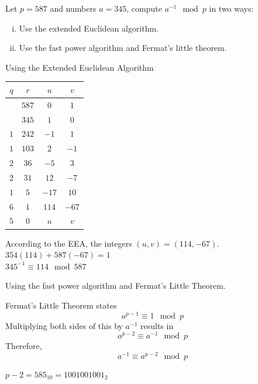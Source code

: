 \documentclass[12pt]{article}
\begin{document}

\problem Let $p=587$ and numbers $a=345$, compute $a^{-1}\mod{p}$ in two
ways:

\begin{enumerate}[(i)]
    \item Use the extended Euclidean algorithm.
    \item Use the fast power algorithm and Fermat’s little theorem. 
\end{enumerate}

\solution Using the Extended Euclidean Algorithm

\noindent
\begin{tabular}{|c|c|c|c|}
    \hline
    $q$ & $r$   & $u$  & $v$  \\
    \hline
        & $587$ & $0$   & $1$   \\
        & $345$ & $1$   & $0$   \\
    $1$ & $242$ & $-1$  & $1$   \\
    $1$ & $103$ & $2$   & $-1$  \\
    $2$ & $36$  & $-5$  & $3$   \\
    $2$ & $31$  & $12$  & $-7$  \\
    $1$ & $5$   & $-17$ & $10$  \\
    $6$ & $1$   & $114$ & $-67$ \\
    $5$ & $0$   & $u$   & $v$   \\
    \hline
\end{tabular}

\noindent
According to the EEA, the integers $(u,v)=(114,-67)$.\\
$354(114)+587(-67)=1$\\
$345^{-1}\equiv114\mod{587}$

\newpage
\noindent
Using the fast power algorithm and Fermat's Little Theorem.

\noindent
Fermat's Little Theorem states
\[a^{p-1}\equiv 1\mod{p}\]
Multiplying both sides of this by $a^{-1}$ results in
\[a^{p-2}\equiv a^{-1}\mod{p}\]
Therefore, 
\[a^{-1}\equiv a^{p-2}\mod{p}\]

\noindent
$p-2=585_{10}=1001001001_2$
\end{document}
